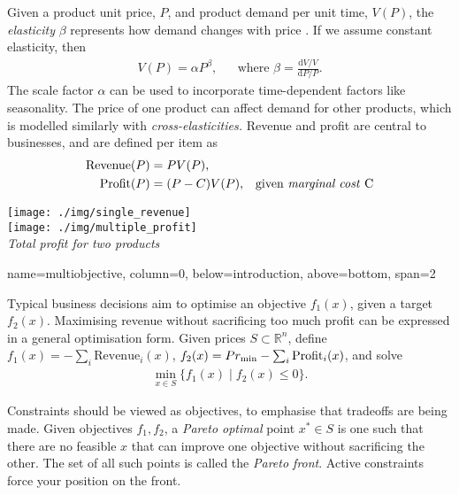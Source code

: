 \documentclass[a0paper,landscape,fontscale=0.35]{baposter}
\newcommand{\mycaption}[1]{
  {
    \smaller
    \emph{#1}
  }
}
\begin{document}
\begin{poster}
{\begin{minipage}[h]{.7\textwidth}
    Given a product unit price, $P$, and product demand per unit time,
    $V(P)$, the \emph{elasticity} $\beta$ represents how demand
    changes with price \citep{ryzin2012}. If we assume constant
    elasticity, then
    \begin{align}
      V(P) = \alpha P^\beta,
      &&\text{where } \beta = \frac{\mathrm d V/V}{\mathrm d P/P}.
    \end{align}
    The scale factor $\alpha$ can be used to incorporate
    time-dependent factors like seasonality. The price of one product
    can affect demand for other products, which is modelled similarly
    with \emph{cross-elasticities.}
    Revenue and profit are central to businesses, and are defined per
    item as
    \begin{align}
      \mbox{Revenue}(P) &= PV(P),\\
      \mbox{Profit}(P) &= (P-C)V(P),& \text{given \emph{marginal cost} C}
    \end{align}
  \end{minipage}%
  \begin{minipage}[h]{.3\textwidth}
    \centering
    \texttt{[image: ./img/single\_revenue]}
    \\[0.5em]
    \texttt{[image: ./img/multiple\_profit]}\\
    \mycaption{Total profit for two products}
  \end{minipage}%
}

{name=multiobjective, column=0, below=introduction, above=bottom, span=2}
{
  \begin{minipage}[h]{0.7\textwidth}
    Typical business decisions aim to optimise an objective $f_1(x)$,
    given a target $f_2(x)$. Maximising revenue without sacrificing too
    much profit can be expressed in a general optimisation form. Given
    prices $S\subset \mathbb R^n$, define
    $f_1(x) = -\sum_i \mbox{Revenue}_i(x)$, $f_2(x) =
    \nobreak Pr_{\min}-\nobreak \sum_i\mbox{Profit}_i(x)$, and solve
    \begin{align}
      \min_{x\in S}\{f_1(x)\mid f_2(x)\leq 0\}.
    \end{align}

    Constraints should be viewed as objectives, to emphasise that
    tradeoffs are being made.
    Given objectives $f_1,f_2$,
    a \emph{Pareto optimal} point $x^*\in S$ is one such
    that there are no feasible $x$ that can improve one objective
    without sacrificing the other. The set of all such points is
    called the \emph{Pareto front}. Active constraints force your
    position on the front.\\


\end{minipage}}
\end{poster}
\end{document}
